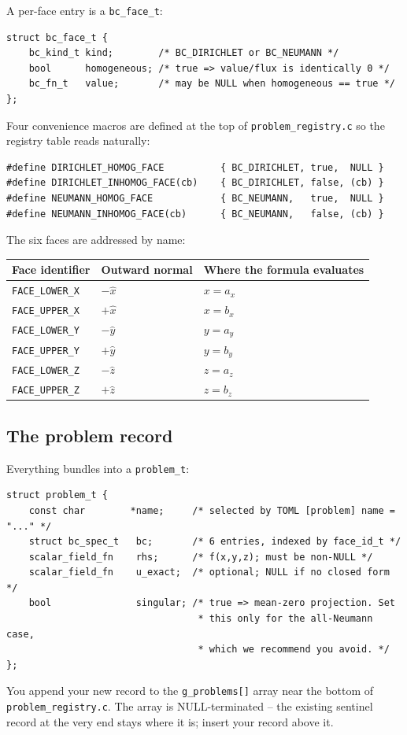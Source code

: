 \documentclass[11pt]{article}
\begin{document}
A per-face entry is a \texttt{bc\_face\_t}:
\begin{lstlisting}
struct bc_face_t {
    bc_kind_t kind;        /* BC_DIRICHLET or BC_NEUMANN */
    bool      homogeneous; /* true => value/flux is identically 0 */
    bc_fn_t   value;       /* may be NULL when homogeneous == true */
};
\end{lstlisting}
Four convenience macros are defined at the top of
\texttt{problem\_registry.c} so the registry table reads naturally:
\begin{lstlisting}
#define DIRICHLET_HOMOG_FACE          { BC_DIRICHLET, true,  NULL }
#define DIRICHLET_INHOMOG_FACE(cb)    { BC_DIRICHLET, false, (cb) }
#define NEUMANN_HOMOG_FACE            { BC_NEUMANN,   true,  NULL }
#define NEUMANN_INHOMOG_FACE(cb)      { BC_NEUMANN,   false, (cb) }
\end{lstlisting}
The six faces are addressed by name:
\begin{center}
\begin{tabular}{lll}
\toprule
Face identifier & Outward normal & Where the formula evaluates \\
\midrule
\texttt{FACE\_LOWER\_X} & $-\hat{x}$ & $x = a_x$ \\
\texttt{FACE\_UPPER\_X} & $+\hat{x}$ & $x = b_x$ \\
\texttt{FACE\_LOWER\_Y} & $-\hat{y}$ & $y = a_y$ \\
\texttt{FACE\_UPPER\_Y} & $+\hat{y}$ & $y = b_y$ \\
\texttt{FACE\_LOWER\_Z} & $-\hat{z}$ & $z = a_z$ \\
\texttt{FACE\_UPPER\_Z} & $+\hat{z}$ & $z = b_z$ \\
\bottomrule
\end{tabular}
\end{center}

\subsection{The problem record}

Everything bundles into a \texttt{problem\_t}:
\begin{lstlisting}
struct problem_t {
    const char        *name;     /* selected by TOML [problem] name = "..." */
    struct bc_spec_t   bc;       /* 6 entries, indexed by face_id_t */
    scalar_field_fn    rhs;      /* f(x,y,z); must be non-NULL */
    scalar_field_fn    u_exact;  /* optional; NULL if no closed form */
    bool               singular; /* true => mean-zero projection. Set
                                  * this only for the all-Neumann case,
                                  * which we recommend you avoid. */
};
\end{lstlisting}
You append your new record to the \texttt{g\_problems[]} array near
the bottom of \texttt{problem\_registry.c}.  The array is
NULL-terminated -- the existing sentinel record at the very end stays
where it is; insert your record above it.
\end{document}
